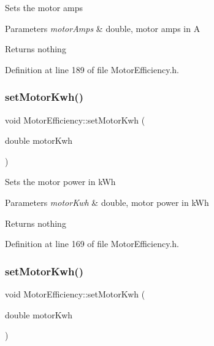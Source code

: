 Sets the motor amps


\begin{DoxyParams}{Parameters}
{\em motor\+Amps} & double, motor amps in A\\
\hline
\end{DoxyParams}
\begin{DoxyReturn}{Returns}
nothing 
\end{DoxyReturn}


Definition at line 189 of file Motor\+Efficiency.\+h.

\mbox{\label{class_motor_efficiency_ab1c7507bac259565e43a6777d079148b}} 
\subsubsection{\texorpdfstring{set\+Motor\+Kwh()}{setMotorKwh()}\hspace{0.1cm}{\footnotesize\ttfamily [1/3]}}
{\footnotesize\ttfamily void Motor\+Efficiency\+::set\+Motor\+Kwh (\begin{DoxyParamCaption}\item[{double}]{motor\+Kwh }\end{DoxyParamCaption})\hspace{0.3cm}{\ttfamily [inline]}}

Sets the motor power in k\+Wh


\begin{DoxyParams}{Parameters}
{\em motor\+Kwh} & double, motor power in k\+Wh\\
\hline
\end{DoxyParams}
\begin{DoxyReturn}{Returns}
nothing 
\end{DoxyReturn}


Definition at line 169 of file Motor\+Efficiency.\+h.

\mbox{\label{class_motor_efficiency_ab1c7507bac259565e43a6777d079148b}} 
\subsubsection{\texorpdfstring{set\+Motor\+Kwh()}{setMotorKwh()}\hspace{0.1cm}{\footnotesize\ttfamily [2/3]}}
{\footnotesize\ttfamily void Motor\+Efficiency\+::set\+Motor\+Kwh (\begin{DoxyParamCaption}\item[{double}]{motor\+Kwh }\end{DoxyParamCaption})\hspace{0.3cm}{\ttfamily [inline]}}

